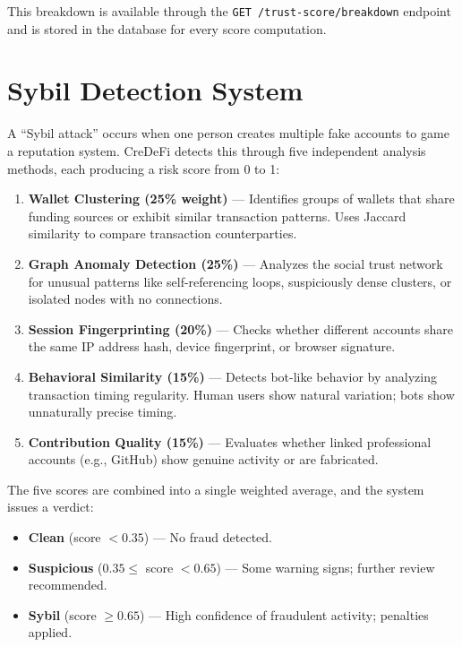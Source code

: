 \documentclass[12pt, a4paper]{article}
\begin{document}
This breakdown is available through the \texttt{GET /trust-score/breakdown} endpoint and is stored in the database for every score computation.


\section{Sybil Detection System}

A ``Sybil attack'' occurs when one person creates multiple fake accounts to game a reputation system. CreDeFi detects this through five independent analysis methods, each producing a risk score from 0 to 1:

\begin{enumerate}[nosep]
    \item \textbf{Wallet Clustering (25\% weight)} --- Identifies groups of wallets that share funding sources or exhibit similar transaction patterns. Uses Jaccard similarity to compare transaction counterparties.
    \item \textbf{Graph Anomaly Detection (25\%)} --- Analyzes the social trust network for unusual patterns like self-referencing loops, suspiciously dense clusters, or isolated nodes with no connections.
    \item \textbf{Session Fingerprinting (20\%)} --- Checks whether different accounts share the same IP address hash, device fingerprint, or browser signature.
    \item \textbf{Behavioral Similarity (15\%)} --- Detects bot-like behavior by analyzing transaction timing regularity. Human users show natural variation; bots show unnaturally precise timing.
    \item \textbf{Contribution Quality (15\%)} --- Evaluates whether linked professional accounts (e.g., GitHub) show genuine activity or are fabricated.
\end{enumerate}

The five scores are combined into a single weighted average, and the system issues a verdict:
\begin{itemize}[nosep]
    \item \textbf{Clean} (score $< 0.35$) --- No fraud detected.
    \item \textbf{Suspicious} ($0.35 \leq$ score $< 0.65$) --- Some warning signs; further review recommended.
    \item \textbf{Sybil} (score $\geq 0.65$) --- High confidence of fraudulent activity; penalties applied.
\end{itemize}
\end{document}
